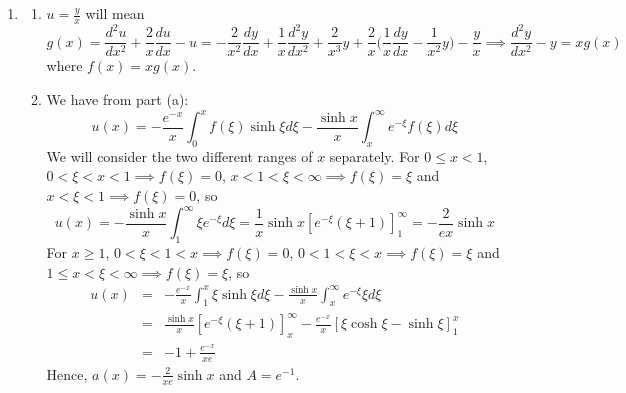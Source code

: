 \documentclass[a4paper]{article}
\begin{document}
\begin{ans}
\begin{enumerate}[label=(\alph*)]
$$        \begin{array}{ll}
      -e^{-\xi}\sinh(x) & 0\leq x<\xi<\infty \\
     -e^{-x}\sinh\xi& 0\leq\xi<x<\infty
        \end{array}
    \right.$$
The general solution will be
$$y(x)=\int_0^\infty f(\xi)G(x,\xi)d\xi=-e^{-x}\int_0^xf(\xi)\sinh\xi d\xi-\sinh x\int_x^\infty e^{-\xi}f(\xi)d\xi$$
\item \begin{enumerate}[label=(\roman*)]
\item $u=\frac{y}{x}$ will mean
$$g(x)=\frac{d^2u}{dx^2}+\frac{2}{x}\frac{du}{dx}-u=-\frac{2}{x^2}\frac{dy}{dx}+\frac{1}{x}\frac{d^2y}{dx^2}+\frac{2}{x^3}y+\frac{2}{x}\bigg(\frac{1}{x}\frac{dy}{dx}-\frac{1}{x^2}y\bigg)-\frac{y}{x}\implies\frac{d^2y}{dx^2}-y=xg(x)$$
where $f(x)=xg(x)$.
\item We have from part (a):
$$u(x)=-\frac{e^{-x}}{x}\int_0^xf(\xi)\sinh\xi d\xi-\frac{\sinh x}{x}\int_x^\infty e^{-\xi}f(\xi)d\xi$$
We will consider the two different ranges of $x$ separately. For $0\leq x<1$, $0<\xi<x<1\implies f(\xi)=0$, $x<1<\xi<\infty\implies f(\xi)=\xi$ and  $x<\xi<1\implies f(\xi)=0$, so
$$u(x)=-\frac{\sinh x}{x}\int_1^\infty \xi e^{-\xi}d\xi=\frac{1}{x}\sinh x[e^{-\xi}(\xi+1)]_1^\infty=-\frac{2}{ex}\sinh x$$
For $x\geq 1$, $0<\xi<1<x\implies f(\xi)=0$, $0<1<\xi<x\implies f(\xi)=\xi$ and $1\leq x<\xi<\infty\implies f(\xi)=\xi$, so
\begin{eqnarray}
u(x)&=&-\frac{e^{-x}}{x}\int_1^x\xi\sinh\xi d\xi-\frac{\sinh x}{x}\int_x^\infty e^{-\xi}\xi d\xi\nonumber\\&=&\frac{\sinh x}{x}[e^{-\xi}(\xi+1)]_x^\infty -\frac{e^{-x}}{x}[\xi\cosh\xi-\sinh\xi]_1^x\nonumber\\&=&-1+\frac{e^{-x}}{xe}\nonumber
\end{eqnarray}
Hence, $a(x)=-\frac{2}{xe}\sinh x$ and $A=e^{-1}$. 
\end{enumerate}
\end{enumerate}
\end{ans}
\newpage
\end{document}
